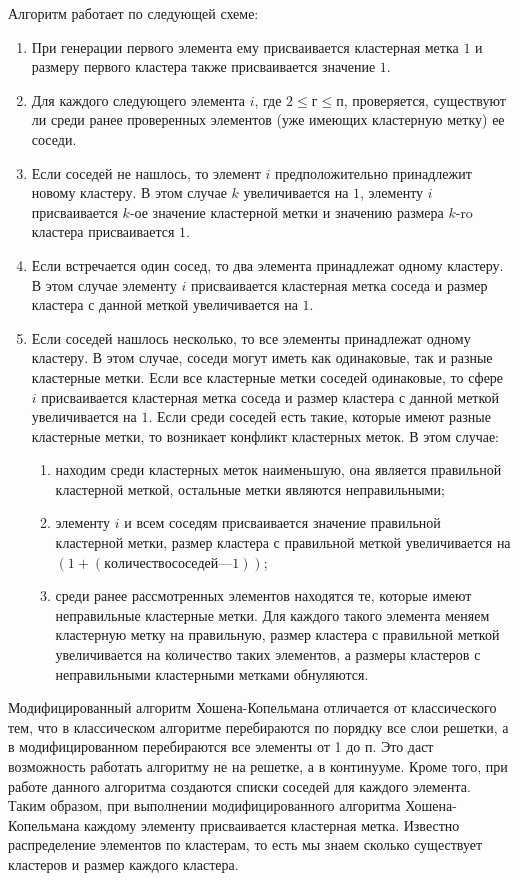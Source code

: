 Алгоритм работает по следующей схеме: 
\begin{enumerate}
    \item При генерации первого элемента ему присваивается кластерная метка $1$ и размеру первого кластера также присваивается значение $1$. 
    \item Для каждого следующего элемента $i$, где $2 \leq г \leq п$, проверяется, существуют ли среди ранее проверенных элементов (уже имеющих кластерную метку) ее соседи.
    \item Если соседей не нашлось, то элемент $i$ предположительно принадлежит новому кластеру. В этом случае $k$ увеличивается на $1$, элементу $i$ присваивается $k$-ое значение кластерной метки и значению размера $k$-ro кластера присваивается $1$. 
    \item Если встречается один сосед, то два элемента принадлежат одному кластеру. В этом случае элементу $i$ присваивается кластерная метка соседа и размер кластера с данной меткой увеличивается на $1$. 
    \item Если соседей нашлось несколько, то все элементы принадлежат одному кластеру. В этом случае, соседи могут иметь как одинаковые, так и разные кластерные метки. Если все кластерные метки соседей одинаковые, то сфере $i$ присваивается кластерная метка соседа и размер кластера с данной меткой увеличивается на $1$. Если среди соседей есть такие, которые имеют разные кластерные метки, то возникает конфликт кластерных меток. В этом случае: 
    \begin{enumerate}
        \item находим среди кластерных меток наименьшую, она является правильной кластерной меткой, остальные метки являются неправильными; 
        \item элементу $i$ и всем соседям присваивается значение правильной кластерной метки, размер кластера с правильной меткой увеличивается на $(1+(количество соседей—1))$; 
        \item среди ранее рассмотренных элементов находятся те, которые имеют неправильные кластерные метки. Для каждого такого элемента меняем кластерную метку на правильную, размер кластера с правильной меткой увеличивается на количество таких элементов, а размеры кластеров с неправильными кластерными метками обнуляются. 
    \end{enumerate}
\end{enumerate}

Модифицированный алгоритм Хошена-Копельмана отличается от классического тем, что в классическом алгоритме перебираются по порядку все слои решетки, а в модифицированном перебираются все элементы от 1 до п. Это даст возможность работать алгоритму не на решетке, а в континууме. Кроме того, при работе данного алгоритма создаются списки соседей для каждого элемента. Таким образом, при выполнении модифицированного алгоритма Хошена-Копельмана каждому элементу присваивается кластерная метка. Известно распределение элементов по кластерам, то есть мы знаем сколько существует кластеров и размер каждого кластера. 


